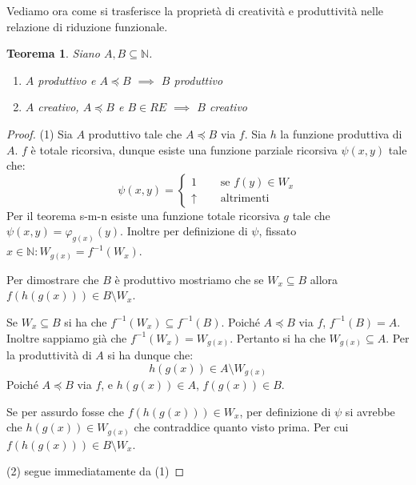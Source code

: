 \documentclass[a4paper,titlepage]{article}
\newtheorem{theorem}{Teorema}[section]
\theoremstyle{definition}
\newcommand{\N}{\mathbb{N}}
\begin{document}
Vediamo ora come si trasferisce la proprietà di creatività e produttività nelle relazione di riduzione funzionale. 
\begin{theorem}
	Siano $A,B\subseteq\N$.
	\begin{enumerate}[(1)]
		\item $A$ produttivo e $A\preceq B$ $\implies$ $B$ produttivo
		\item $A$ creativo, $A\preceq B$ e $B\in RE$ $\implies$ $B$ creativo 
	\end{enumerate}
\end{theorem}
\begin{proof}
	(1) Sia $A$ produttivo tale che $A\preceq B$ via $f$. Sia $h$ la funzione produttiva di $A$. $f$ è totale ricorsiva, dunque esiste una funzione parziale ricorsiva $\psi(x,y)$ tale che:
	\[
		\psi(x,y)=
		\begin{cases}
			1 			    &\quad\text{ se } f(y)\in W_x\\
			\uparrow  &\quad\text{ altrimenti } 
		\end{cases}
	\]
	Per il teorema s-m-n esiste una funzione totale ricorsiva $g$ tale che $\psi(x,y)=\varphi_{g(x)}(y)$. Inoltre per definizione di $\psi$, fissato $x\in\N:W_{g(x)}=f^{-1}(W_x)$. 
	
	Per dimostrare che $B$ è produttivo mostriamo che se $W_x\subseteq B$ allora $f(h(g(x)))\in B\setminus W_x$.
	
	Se $W_x\subseteq B$ si ha che $f^{-1}(W_x)\subseteq f^{-1}(B)$. Poiché $A\preceq B$ via $f$, $f^{-1}(B)=A$. Inoltre sappiamo già che $f^{-1}(W_x)=W_{g(x)}$. Pertanto si ha che $W_{g(x)}\subseteq A$. Per la produttività di $A$ si ha dunque che:
	\[
		h(g(x))\in A\setminus W_{g(x)}
	\]
	Poiché $A\preceq B$ via $f$, e $h(g(x))\in A$, $f(g(x))\in B$.
	
	Se per assurdo fosse che $f(h(g(x)))\in W_x$, per definizione di $\psi$ si avrebbe che $h(g(x))\in W_{g(x)}$ che contraddice quanto visto prima. Per cui $f(h(g(x)))\in B\setminus W_x$.
	
	(2) segue immediatamente da (1)
\end{proof}
	
\end{document}
